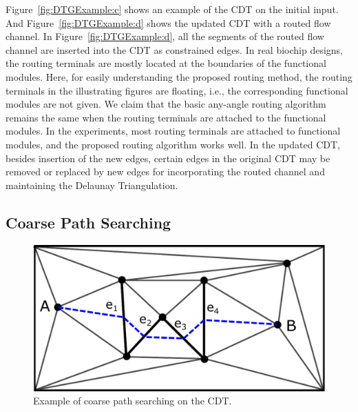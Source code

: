 \documentclass[journal]{IEEEtran}
\begin{document}
Figure~\ref{fig:DTGExample:c} shows an example of the CDT on the initial input. And Figure~\ref{fig:DTGExample:d} shows the updated CDT with a routed flow channel. 
In Figure~\ref{fig:DTGExample:d}, all the segments of the routed flow channel are inserted into the CDT as constrained edges. 
In real biochip designs, the routing terminals are mostly located at
the boundaries of the functional modules. Here, for easily understanding
the proposed routing method, the routing terminals in the illustrating 
figures are floating, i.e., the corresponding functional modules are not 
given. We claim that the basic any-angle routing algorithm remains the same
when the routing terminals are attached to the functional modules. 
In the experiments, most routing terminals are attached to functional
modules, and the proposed routing algorithm works well. 
In the updated CDT, besides insertion of the new edges, certain edges 
in the original CDT may be removed or replaced by new edges for
incorporating the routed channel and maintaining the Delaunay Triangulation.

\subsection{Coarse Path Searching}
\label{sec:toporoute}

\begin{figure}[htbp]
\centering
\includegraphics[width=0.75\columnwidth, angle=0]{./Figs/DTGExampleE.pdf}
\vspace{-0.15cm}
\caption{Example of coarse path searching on the CDT.}
\label{fig:DTGExampleE}
\end{figure}
\end{document}

